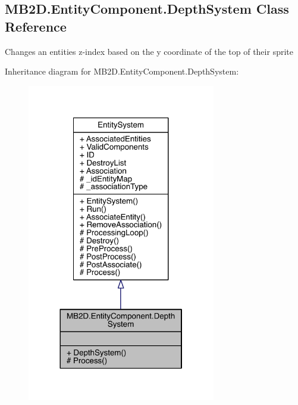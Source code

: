 \hypertarget{class_m_b2_d_1_1_entity_component_1_1_depth_system}{}\subsection{M\+B2\+D.\+Entity\+Component.\+Depth\+System Class Reference}
\label{class_m_b2_d_1_1_entity_component_1_1_depth_system}


Changes an entities z-\/index based on the y coordinate of the top of their sprite  




Inheritance diagram for M\+B2\+D.\+Entity\+Component.\+Depth\+System\+:
\nopagebreak
\begin{figure}[H]
\begin{center}
\leavevmode
\includegraphics[width=233pt]{class_m_b2_d_1_1_entity_component_1_1_depth_system__inherit__graph}
\end{center}
\end{figure}


